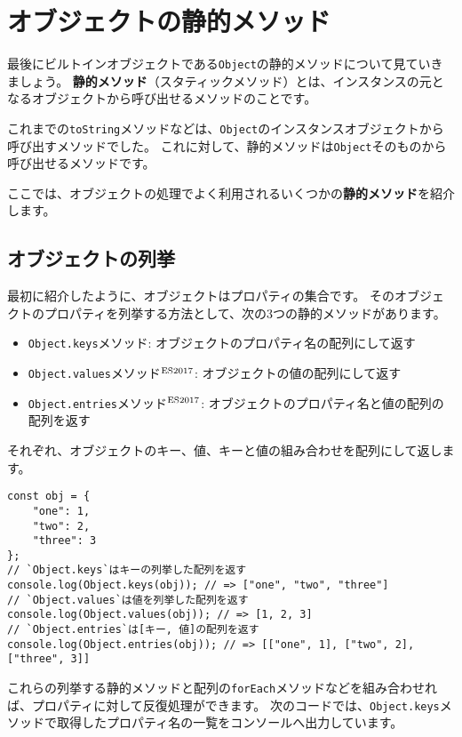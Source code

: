 \hypertarget{static-method}{%
\section{オブジェクトの静的メソッド}\label{static-method}}

最後にビルトインオブジェクトである\texttt{Object}の静的メソッドについて見ていきましょう。
\textbf{静的メソッド}（スタティックメソッド）とは、インスタンスの元となるオブジェクトから呼び出せるメソッドのことです。

これまでの\texttt{toString}メソッドなどは、\texttt{Object}のインスタンスオブジェクトから呼び出すメソッドでした。
これに対して、静的メソッドは\texttt{Object}そのものから呼び出せるメソッドです。

ここでは、オブジェクトの処理でよく利用されるいくつかの\textbf{静的メソッド}を紹介します。

\hypertarget{enumeration}{%
\subsection{オブジェクトの列挙}\label{enumeration}}

最初に紹介したように、オブジェクトはプロパティの集合です。
そのオブジェクトのプロパティを列挙する方法として、次の3つの静的メソッドがあります。

\begin{itemize}
\item
  \texttt{Object.keys}メソッド:
  オブジェクトのプロパティ名の配列にして返す
\item
  \texttt{Object.values}メソッド{$^{\rm ES2017}$}:
  オブジェクトの値の配列にして返す
\item
  \texttt{Object.entries}メソッド{$^{\rm ES2017}$}:
  オブジェクトのプロパティ名と値の配列の配列を返す
\end{itemize}

それぞれ、オブジェクトのキー、値、キーと値の組み合わせを配列にして返します。

\begin{lstlisting}
const obj = {
    "one": 1,
    "two": 2,
    "three": 3
};
// `Object.keys`はキーの列挙した配列を返す
console.log(Object.keys(obj)); // => ["one", "two", "three"]
// `Object.values`は値を列挙した配列を返す
console.log(Object.values(obj)); // => [1, 2, 3]
// `Object.entries`は[キー, 値]の配列を返す
console.log(Object.entries(obj)); // => [["one", 1], ["two", 2], ["three", 3]]
\end{lstlisting}

これらの列挙する静的メソッドと配列の\texttt{forEach}メソッドなどを組み合わせれば、プロパティに対して反復処理ができます。
次のコードでは、\texttt{Object.keys}メソッドで取得したプロパティ名の一覧をコンソールへ出力しています。

